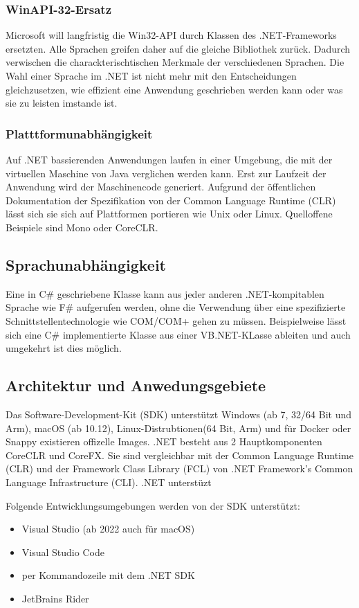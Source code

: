 \subsubsection{WinAPI-32-Ersatz}
Microsoft will langfristig die Win32-API durch Klassen des .NET-Frameworks ersetzten. Alle Sprachen greifen 
daher auf die gleiche Bibliothek zurück. Dadurch verwischen die charackterischtischen Merkmale der verschiedenen Sprachen. 
Die Wahl einer Sprache im .NET ist nicht mehr mit den Entscheidungen gleichzusetzen, wie effizient eine Anwendung geschrieben werden kann 
oder was sie zu leisten imstande ist.

\subsubsection{Platttformunabhängigkeit}
Auf .NET bassierenden Anwendungen laufen in einer Umgebung, die mit der virtuellen Maschine von Java verglichen werden kann.
Erst zur Laufzeit der Anwendung wird der Maschinencode generiert. Aufgrund der öffentlichen Dokumentation der Spezifikation von 
der Common Language Runtime (CLR) lässt sich sie sich auf Plattformen portieren wie Unix oder Linux. 
Quelloffene Beispiele sind Mono oder CoreCLR.

\subsection{Sprachunabhängigkeit}
Eine in C\# geschriebene Klasse kann aus jeder anderen .NET-kompitablen Sprache wie F\# aufgerufen werden, ohne die Verwendung über eine 
spezifizierte Schnittstellentechnologie wie COM/COM+ gehen zu müssen. Beispielweise lässt sich eine C\# implementierte Klasse aus einer 
VB.NET-KLasse ableiten und auch umgekehrt ist dies möglich.

\subsection{Architektur und Anwedungsgebiete}
Das Software-Development-Kit (SDK) unterstützt Windows (ab 7, 32/64 Bit und Arm), macOS (ab 10.12), Linux-Distrubtionen(64 Bit, Arm) 
und für Docker oder Snappy existieren offizelle Images. .NET besteht aus 2 Hauptkomponenten CoreCLR und CoreFX. 
Sie sind vergleichbar mit der Common Language Runtime (CLR) und der  Framework Class Library (FCL) 
von .NET Framework's Common Language Infrastructure (CLI). .NET unterstüzt 

Folgende Entwicklungsumgebungen werden von der SDK unterstützt:
\begin{itemize}
    \item Visual Studio (ab 2022 auch für macOS)
    \item Visual Studio Code
    \item per Kommandozeile mit dem .NET SDK
    \item JetBrains Rider 
\end{itemize}

